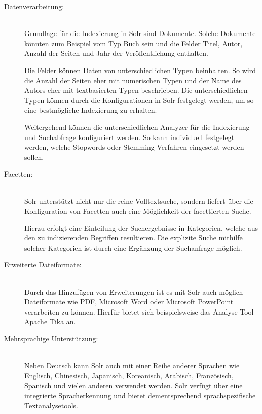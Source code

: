 \begin{description}
    \item[Datenverarbeitung:]\hfill \\
    Grundlage für die Indexierung in Solr sind \glqq Dokumente\grqq{}. Solche Dokumente könnten zum Beispiel vom Typ \glqq Buch\grqq{} sein und die Felder \glqq Titel\grqq{}, \glqq Autor\grqq{}, \glqq Anzahl der Seiten\grqq{} und \glqq Jahr der Veröffentlichung\grqq{} enthalten.

    Die Felder können Daten von unterschiedlichen Typen beinhalten. So wird die Anzahl der Seiten eher mit numerischen Typen und der Name des Autors eher mit textbasierten Typen beschrieben. Die unterschiedlichen Typen können durch die Konfigurationen in Solr festgelegt werden, um so eine bestmögliche Indexierung zu erhalten.

    Weitergehend können die unterschiedlichen Analyzer für die Indexierung und Suchabfrage konfiguriert werden. So kann individuell festgelegt werden, welche Stopwords oder Stemming-Verfahren eingesetzt werden sollen.

    \item[Facetten:]\hfill \\
    Solr unterstützt nicht nur die reine Volltextsuche, sondern liefert über die Konfiguration von Facetten auch eine Möglichkeit der facettierten Suche.

    Hierzu erfolgt eine Einteilung der Suchergebnisse in Kategorien, welche aus den zu indizierenden Begriffen resultieren. Die explizite Suche mithilfe solcher Kategorien ist durch eine Ergänzung der Suchanfrage möglich.

    \item[Erweiterte Dateiformate:]\hfill \\
    Durch das Hinzufügen von Erweiterungen ist es mit Solr auch möglich Dateiformate wie PDF, Microsoft Word oder Microsoft PowerPoint verarbeiten zu können. Hierfür bietet sich beispielsweise das Analyse-Tool \glqq Apache Tika\grqq{} an.
    
    \item[Mehrsprachige Unterstützung:]\hfill \\
    Neben Deutsch kann Solr auch mit einer Reihe anderer Sprachen wie Englisch, Chinesisch, Japanisch, Koreanisch, Arabisch, Französisch, Spanisch und vielen anderen verwendet werden. Solr verfügt über eine integrierte Spracherkennung und bietet dementsprechend sprachspezifische Textanalysetools.

\end{description}

